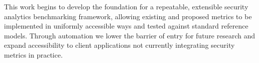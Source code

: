 This work begins to develop the foundation for a repeatable, extensible security analytics benchmarking framework, allowing existing and proposed metrics to be implemented in uniformly accessible ways and tested against standard reference models. Through automation we lower the barrier of entry for future research and expand accessibility to client applications not currently integrating security metrics in practice. 








